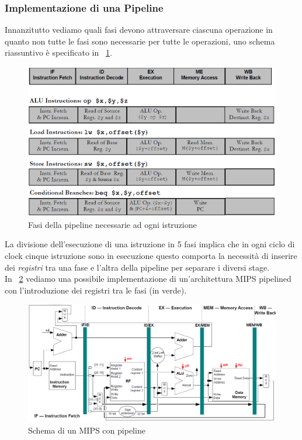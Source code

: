 \subsubsection{Implementazione di una Pipeline}
Innanzitutto vediamo quali fasi devono attraversare ciascuna operazione in quanto non tutte le fasi sono necessarie per tutte le operazioni, uno schema riassuntivo è specificato in \figurename~\ref{fig:pipefasi}. \\
\begin{figure}[tbh]
\centering
\includegraphics[scale=0.45]{img/pipefasi.png}
\caption{Fasi della pipeline necessarie ad ogni istruzione}\label{fig:pipefasi}
\end{figure}
La divisione dell'esecuzione di una istruzione in 5 fasi implica che in ogni ciclo di clock cinque istruzione sono in esecuzione questo comporta la necessità di inserire dei \emph{registri} tra una fase e l'altra della pipeline per separare i diversi stage.\\
In \figurename~\ref{fig:pipeline} vediamo una possibile implementazione di un'architettura MIPS pipelined con l'introduzione dei registri tra le fasi (in verde).
\begin{figure}[!Htb]
\centering
\includegraphics[scale=0.6, angle=90]{img/pipeline.png}
\caption{Schema di un MIPS con pipeline}\label{fig:pipeline}
\end{figure}
